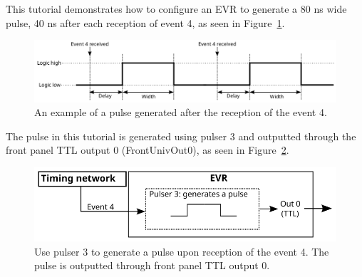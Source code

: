 \documentclass[12pt,a4paper]{article}
\begin{document}
This tutorial demonstrates how to configure an EVR to generate a 80 ns wide pulse, 40 ns after each reception of event 4, as seen in Figure~\ref{fig:pulser_signal}. 
\begin{figure}[H]
	\centering
	\includegraphics[width=\columnwidth]{./img/pulserSignal}
	\caption{An example of a pulse generated after the reception of the event 4.}
	\label{fig:pulser_signal}
\end{figure}
The pulse in this tutorial is generated using pulser 3 and outputted through the front panel TTL output 0 (FrontUnivOut0), as seen in Figure~\ref{fig:pulser}. 

\begin{figure}[H]
	\centering
	\includegraphics[]{./img/pulser}
	\caption{Use pulser 3 to generate a pulse upon reception of the event 4. The pulse is outputted through front panel TTL output 0.}
	\label{fig:pulser}
\end{figure}
\end{document}
